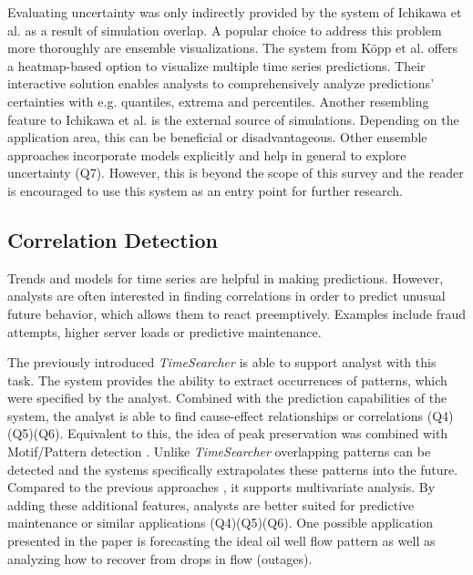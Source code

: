 \documentclass[electronic]{vgtc}             %
\begin{document}
Evaluating uncertainty was only indirectly provided by the system of Ichikawa et al. \cite{ichikawa:2002} as a result of simulation overlap.
A popular choice to address this problem more thoroughly are ensemble visualizations.
The system from K\"opp et al. \cite{koepp:2014} offers a heatmap-based option to visualize multiple time series predictions. 
Their interactive solution enables analysts to comprehensively analyze predictions' certainties with e.g. quantiles, extrema and percentiles. 
Another resembling feature to Ichikawa et al. \cite{ichikawa:2002} is the external source of simulations. 
Depending on the application area, this can be beneficial or disadvantageous. 
Other ensemble approaches incorporate models explicitly and help in general to explore uncertainty (Q7).
However, this is beyond the scope of this survey and the reader is encouraged to use this system as an entry point for further research. 


\subsection{Correlation Detection\label{subsec:correlation}}
Trends and models for time series are helpful in making predictions.  
However, analysts are often interested in finding correlations in order to predict unusual future behavior, which allows them to react preemptively. 
Examples include fraud attempts, higher server loads or predictive maintenance.

The previously introduced \textit{TimeSearcher} \cite{buono:2007} is able to support analyst with this task.
The system provides the ability to extract occurrences of patterns, which were specified by the analyst. 
Combined with the prediction capabilities of the system, the analyst is able to find cause-effect relationships or correlations (Q4)(Q5)(Q6).
Equivalent to this, the idea of peak preservation \cite{Hao:2009, Hao:2011} was combined with Motif/Pattern detection \cite{Hao:2012}.
Unlike \textit{TimeSearcher} \cite{buono:2007} overlapping patterns can be detected and the systems specifically extrapolates these patterns into the future.
Compared to the previous approaches \cite{Hao:2009, Hao:2011}, it supports multivariate analysis. 
By adding these additional features, analysts are better suited for predictive maintenance or similar applications (Q4)(Q5)(Q6). 
One possible application presented in the paper is forecasting the ideal oil well flow pattern as well as analyzing how to recover from drops in flow (outages).   
\end{document}
